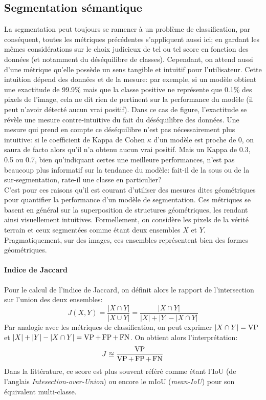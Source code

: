 \subsection{Segmentation sémantique}
La segmentation peut toujours se ramener à un problème de classification, par conséquent, toutes les métriques précédentes s'appliquent aussi ici; en gardant les mêmes considérations sur le choix judicieux de tel ou tel score en fonction des données (et notamment du déséquilibre de classes). Cependant, on attend aussi d'une métrique qu'elle possède un sens tangible et intuitif pour l'utilisateur. Cette intuition dépend des données et de la mesure: par exemple, si un modèle obtient une exactitude de 99.9\% mais que la classe positive ne représente que 0.1\% des pixels de l'image, cela ne dit rien de pertinent sur la performance du modèle (il peut n'avoir détecté aucun vrai positif). Dans ce cas de figure, l'exactitude se révèle une mesure contre-intuitive du fait du déséquilibre des données. Une mesure qui prend en compte ce déséquilibre n'est pas nécessairement plus intuitive: si le coefficient de Kappa de Cohen $\kappa$ d'un modèle est proche de 0, on saura de facto alors qu'il n'a obtenu aucun vrai positif. Mais un Kappa de 0.3, 0.5 ou 0.7, bien qu'indiquant certes une meilleure performances, n'est pas beaucoup plus informatif sur la tendance du modèle: fait-il de la sous ou de la sur-segmentation, rate-il une classe en particulier? \\
C'est pour ces raisons qu'il est courant d'utiliser des mesures dites géométriques pour quantifier la performance d'un modèle de segmentation. Ces métriques se basent en général sur la superposition de structures géométriques, les rendant ainsi visuellement intuitives. 
Formellement, on considère les pixels de la vérité terrain et ceux segmentées comme étant deux ensembles $X$ et $Y$. Pragmatiquement, sur des images, ces ensembles représentent bien des formes géométriques. 
\\
\paragraph{Indice de Jaccard}
Pour le calcul de l'indice de Jaccard, on définit alors le rapport de l'intersection sur l'union des deux ensembles:
\begin{equation}
	J(X, Y) = \frac{|X \cap Y|}{|X \cup Y|} = \frac{|X \cap Y|}{|X| + |Y| - |X \cap Y|}
\end{equation}
Par analogie avec les métriques de classification, on peut exprimer $|X \cap Y| = \operatorname{VP}$ et $|X| + |Y| - |X \cap Y| = \operatorname{VP} + \operatorname{FP} + \operatorname{FN}$. On obtient alors l'interprétation:
\begin{equation}
	J \approxeq \frac{\operatorname{VP}}{\operatorname{VP} + \operatorname{FP} + \operatorname{FN}}
\end{equation}
Dans la littérature, ce score est plus souvent référé comme étant l'IoU (de l'anglais \textit{Intesection-over-Union}) ou encore le mIoU (\textit{mean-IoU}) pour son équivalent multi-classe. 
